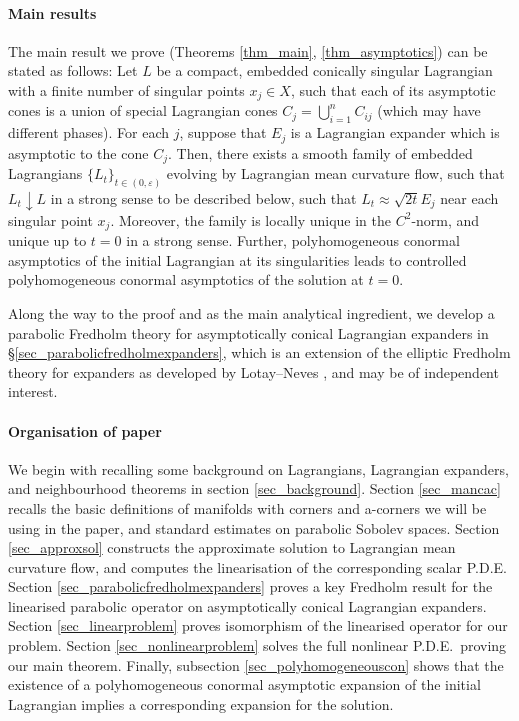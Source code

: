 \documentclass[10pt, a4paper]{article}
\theoremstyle{plain}%
\theoremstyle{definition}
\numberwithin{figure}{section}
\numberwithin{equation}{section}
\newcommand{\ep}{\varepsilon}
\begin{document}
\paragraph*{Main results} The main result we prove (Theorems \ref{thm_main}, \ref{thm_asymptotics}) can be stated as follows: Let $L$ be a compact, embedded conically singular Lagrangian with a finite number of singular points $x_j\in X$, such that each of its asymptotic cones is a union of special Lagrangian cones $C_j=\bigcup_{i=1}^n C_{ij}$ (which may have different phases). For each $j$, suppose that $E_j$ is a Lagrangian expander which is asymptotic to the cone $C_j$. Then, there exists a smooth family of embedded Lagrangians $\{L_t\}_{t\in (0,\ep)}$ evolving by Lagrangian mean curvature flow, such that $L_t\downarrow L$ in a strong sense to be described below, such that $L_t\approx \sqrt{2t}E_j$ near each singular point $x_j$. Moreover, the family is locally unique in the $C^2$-norm, and unique up to $t=0$ in a strong sense. Further, polyhomogeneous conormal asymptotics of the initial Lagrangian at its singularities leads to controlled polyhomogeneous conormal asymptotics of the solution at $t=0$.

Along the way to the proof and as the main analytical ingredient, we develop a parabolic Fredholm theory for asymptotically conical Lagrangian expanders in \S\ref{sec_parabolicfredholmexpanders}, which is an extension of the elliptic Fredholm theory for expanders as developed by Lotay--Neves \cite{LN13}, and may be of independent interest.



\paragraph*{Organisation of paper} We begin with recalling some background on Lagrangians, Lagrangian expanders, and neighbourhood theorems in section \ref{sec_background}. Section \ref{sec_mancac} recalls the basic definitions of manifolds with corners and a-corners we will be using in the paper, and standard estimates on parabolic Sobolev spaces. Section \ref{sec_approxsol} constructs the approximate solution to Lagrangian mean curvature flow, and computes the linearisation of the corresponding scalar P.D.E.\; Section \ref{sec_parabolicfredholmexpanders} proves a key Fredholm result for the linearised parabolic operator on asymptotically conical Lagrangian expanders. Section \ref{sec_linearproblem} proves isomorphism of the linearised operator for our problem. Section \ref{sec_nonlinearproblem} solves the full nonlinear P.D.E.\, proving our main theorem. Finally, subsection \ref{sec_polyhomogeneouscon} shows that the existence of a polyhomogeneous conormal asymptotic expansion of the initial Lagrangian implies a corresponding expansion for the solution. 
\end{document}
